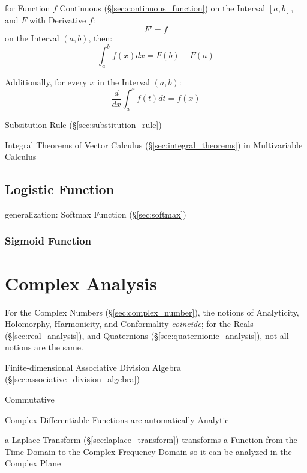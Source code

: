 for Function $f$ Continuous (\S\ref{sec:continuous_function}) on the Interval
$[a,b]$, and $F$ with Derivative $f$:
\[
  F' = f
\]
on the Interval $(a,b)$, then:
\[
  \int_a^b f(x) dx = F(b) - F(a)
\]

Additionally, for every $x$ in the Interval $(a,b)$:
\[
  \frac{d}{dx}\int^x_a f(t) dt = f(x)
\]

\fist Subsitution Rule (\S\ref{sec:substitution_rule})

\fist Integral Theorems of Vector Calculus
(\S\ref{sec:integral_theorems}) in Multivariable Calculus



\subsection{Logistic Function}\label{sec:logistic_function}


\fist generalization: Softmax Function (\S\ref{sec:softmax})



\subsubsection{Sigmoid Function}\label{sec:sigmoid_function}



\section{Complex Analysis}\label{sec:complex_analysis}

For the Complex Numbers (\S\ref{sec:complex_number}), the notions of
Analyticity, Holomorphy, Harmonicity, and Conformality \emph{coincide}; for the
Reals (\S\ref{sec:real_analysis}), and Quaternions
(\S\ref{sec:quaternionic_analysis}), not all notions are the same.

Finite-dimensional Associative Division Algebra
(\S\ref{sec:associative_division_algebra})

Commutative

Complex Differentiable Functions are automatically Analytic %

a Laplace Transform (\S\ref{sec:laplace_transform}) transforms a Function from
the Time Domain to the Complex Frequency Domain so it can be analyzed in the
Complex Plane

